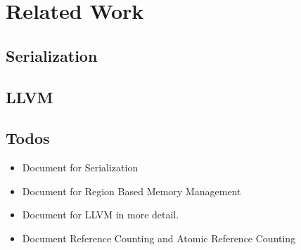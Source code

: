 \chapter{Related Work}
\label{chapter:relatedwork}
\thispagestyle{myheadings}

\graphicspath{{2_RelatedWork/Figures/}}

\label{sec:history}

\clearpage

\section{Serialization}
\label{sec:history}

\clearpage


\section{LLVM}
\label{sec:history}



\section{Todos}
\label{sec:history}
\begin{itemize}
    \item Document for Serialization
    \item Document for Region Based Memory Management
    \item Document for LLVM in more detail.
    \item Document Reference Counting and Atomic Reference Counting
\end{itemize}




